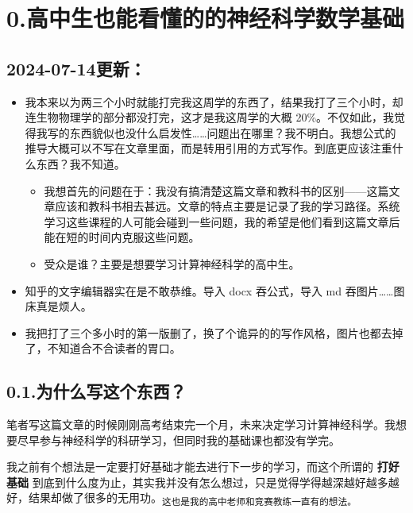 \documentclass[
]{article}
\author{}
\date{}
\begin{document}
\section{0.高中生也能看懂的的神经科学数学基础}\label{0ux9ad8ux4e2dux751fux4e5fux80fdux770bux61c2ux7684ux7684ux795eux7ecfux79d1ux5b66ux6570ux5b66ux57faux7840}

\tableofcontents

\subsection{2024-07-14更新：}\label{2024-07-14ux66f4ux65b0}

\begin{itemize}
\item
  我本来以为两三个小时就能打完我这周学的东西了，结果我打了三个小时，却连生物物理学的部分都没打完，这才是我这周学的大概
  20\%。不仅如此，我觉得我写的东西貌似也没什么启发性\ldots\ldots 问题出在哪里？我不明白。我想公式的推导大概可以不写在文章里面，而是转用引用的方式写作。到底更应该注重什么东西？我不知道。

  \begin{itemize}
  \item
    我想首先的问题在于：我没有搞清楚这篇文章和教科书的区别------这篇文章应该和教科书相去甚远。文章的特点主要是记录了我的学习路径。系统学习这些课程的人可能会碰到一些问题，我的希望是他们看到这篇文章后能在短的时间内克服这些问题。
  \item
    受众是谁？主要是想要学习计算神经科学的高中生。
  \end{itemize}
\item
  知乎的文字编辑器实在是不敢恭维。导入 docx 吞公式，导入 md
  吞图片\ldots\ldots 图床真是烦人。
\item
  我把打了三个多小时的第一版删了，换了个诡异的的写作风格，图片也都去掉了，不知道合不合读者的胃口。
\end{itemize}

\subsection{0.1.为什么写这个东西？}\label{01ux4e3aux4ec0ux4e48ux5199ux8fd9ux4e2aux4e1cux897f}

笔者写这篇文章的时候刚刚高考结束完一个月，未来决定学习计算神经科学。我想要尽早参与神经科学的科研学习，但同时我的基础课也都没有学完。

我之前有个想法是一定要打好基础才能去进行下一步的学习，而这个所谓的
\textbf{打好基础}
到底到什么度为止，其实我并没有怎么想过，只是觉得学得越深越好越多越好，结果却做了很多的无用功。\textsubscript{这也是我的高中老师和竞赛教练一直有的想法。}
\end{document}
